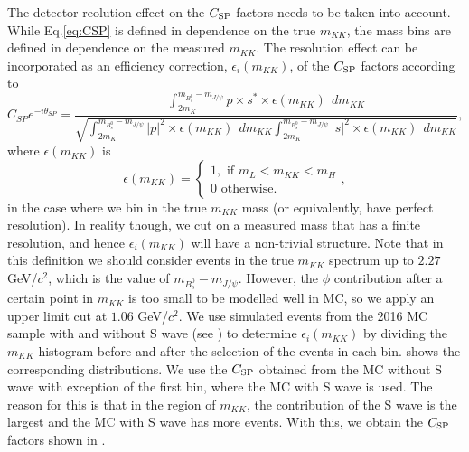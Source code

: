 The detector reolution effect on the $C_{\rm SP}$ factors needs to be taken into account. While Eq.\ref{eq:CSP} is defined in dependence on the true $m_{KK}$, the mass bins are defined in dependence on the measured $m_{KK}$. The resolution effect can be incorporated as an efficiency correction, $\epsilon_i(m_{KK})$, of the $C_{\rm SP}$ factors
according to  
\begin{equation}
C_{SP} e^{-i \theta_{SP}} = \frac{\int_{2m_K}^{m_{B_s^0}-m_{J/\psi}} { p \times s^*\times \epsilon(m_{KK})}  \:\:d m_{KK}}{\sqrt{\int_{2m_K}^{m_{B_s^0}-m_{J/\psi}} { |p|^2\times \epsilon(m_{KK})} 
\:\:d m_{KK} \int_{2m_K}^{m_{B_s^0}-m_{J/\psi}} { |s|^2\times \epsilon(m_{KK})}  \:\:d m_{KK}}},
\label{eq:Csp2}
\end{equation}
\noindent where $\epsilon(m_{KK})$ is
\begin{equation}
\epsilon(m_{KK}) =
\begin{cases}
1, \text{ if $m_L< m_{KK} < m_H$} \\
0 \text{ otherwise}.
\end{cases},
\end{equation}
in the case where we bin in the true $m_{KK}$ mass (or equivalently, have perfect resolution). In reality though, we cut on a measured mass that has a finite resolution, and hence $\epsilon_{i}(m_{KK})$ will have a non-trivial structure. Note that in this definition we should consider events in the true $m_{KK}$ spectrum up to $2.27$ GeV/$c^{2}$, 
which is the value of $m_{B_s^0}-m_{J/\psi}$. However, the $\phi$ contribution after a certain point in $m_{KK}$ is too small to be modelled well in MC, so we apply an upper limit cut at $1.06$ GeV/$c^{2}$.
We use simulated events from the 2016 MC sample with and without S wave (see ) to determine $\epsilon_i(m_{KK})$ by dividing the $m_{KK}$ histogram before and after the selection of the events in each bin.
 shows the corresponding distributions. We use the $C_{\rm SP}$ obtained from the MC without S wave with exception of the first bin, where the MC with S wave is used. The reason for this is that
in the region of $m_{KK}$, the contribution of the S wave is the largest and the MC with S wave has more events. With this, we obtain the $C_{\rm SP}$ factors shown in .

